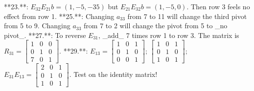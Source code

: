 **23.**: \(E_{32}E_{21}b=(1,-5,-35)\) but \(E_{21}E_{32}b=(1,-5,0)\). Then row 3 feels no effect from row 1.
**25.**: Changing \(a_{33}\) from 7 to 11 will change the third pivot from 5 to 9. Changing \(a_{33}\) from 7 to 2 will change the pivot from 5 to _no pivot_.
**27.**: To reverse \(E_{31}\), _add_ 7 times row 1 to row 3. The matrix is \(R_{31}=\begin{bmatrix}1&0&0\\ 0&1&0\\ 7&0&1\end{bmatrix}\).
**29.**: \(E_{13}=\begin{bmatrix}1&0&1\\ 0&1&0\\ 0&0&1\end{bmatrix}\); \(\begin{bmatrix}1&0&1\\ 0&1&0\\ 1&0&1\end{bmatrix}\); \(E_{31}E_{13}=\begin{bmatrix}2&0&1\\ 0&1&0\\ 1&0&1\end{bmatrix}\). Test on the identity matrix!
